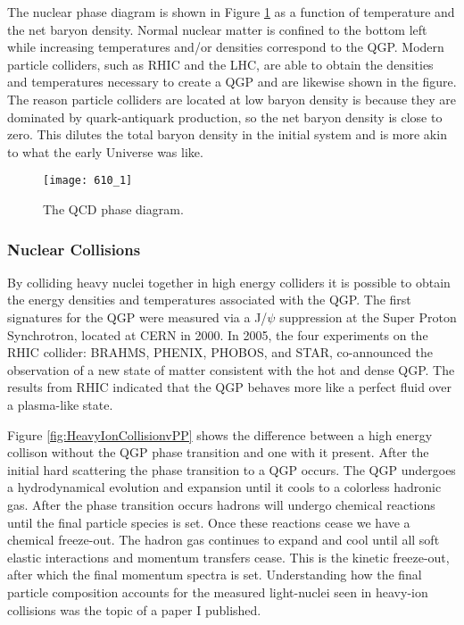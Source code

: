 The nuclear phase diagram is shown in Figure \ref{fig:QCDphase} as a function of temperature and the net baryon density.  Normal nuclear matter is confined to the bottom left while increasing temperatures and/or densities correspond to the QGP.  Modern particle colliders, such as RHIC and the LHC, are able to obtain the densities and temperatures necessary to create a QGP and are likewise shown in the figure.  The reason particle colliders are located at low baryon density is because they are dominated by quark-antiquark production, so the net baryon density is close to zero.  This dilutes the total baryon density in the initial system and is more akin to what the early Universe was like.  

\begin{figure}[h]
\texttt{[image: 610\_1]}
\centering
\caption{The QCD phase diagram\cite{Mohanty:2013yca}.}
\label{fig:QCDphase}
\end{figure}

\subsubsection{Nuclear Collisions}
By colliding heavy nuclei together in high energy colliders it is possible to obtain the energy densities and temperatures associated with the QGP.  The first signatures for the QGP were measured via a J/$\psi$ suppression at the Super Proton Synchrotron, located at CERN in 2000\cite{Csorgo:2000yu}.  In 2005, the four experiments on the RHIC collider: BRAHMS\cite{Arsene:2004fa}, PHENIX\cite{Adcox2005184}, PHOBOS\cite{Back200528}, and STAR\cite{Adams2005102}, co-announced the observation of a new state of matter consistent with the hot and dense QGP.  The results from RHIC indicated that the QGP behaves more like a perfect fluid over a plasma-like state\cite{Jacak310}.

Figure \ref{fig:HeavyIonCollisionvPP} shows the difference between a high energy collison without the QGP phase transition and one with it present.  After the initial hard scattering the phase transition to a QGP occurs.  The QGP undergoes a hydrodynamical evolution and expansion until it cools to a colorless hadronic gas.  After the phase transition occurs hadrons will undergo chemical reactions until the final particle species is set.  Once these reactions cease we have a chemical freeze-out. The hadron gas continues to expand and cool until all soft elastic interactions and momentum transfers cease.  This is the kinetic freeze-out, after which the final momentum spectra is set.  Understanding how the final particle composition accounts for the measured light-nuclei seen in heavy-ion collisions was the topic of a paper I published\cite{Sharma:2018dyb}.


